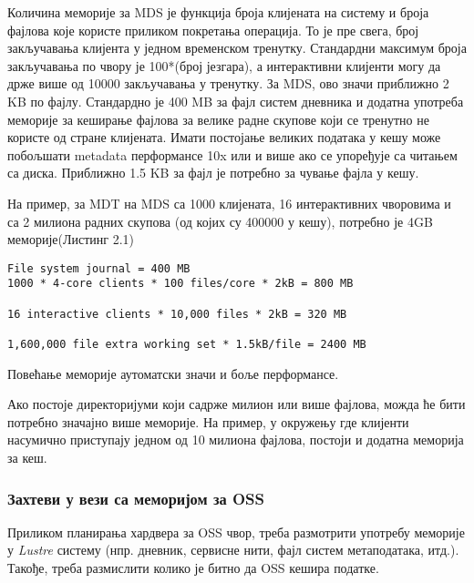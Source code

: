 Количина меморије за MDS је функција броја клијената  на систему и броја фајлова које користе приликом покретања операција. То је пре свега, број закључавања клијента у једном временском тренутку. Стандардни максимум броја закључавања по чвору је 100*(број језгара), а интерактивни клијенти могу да држе више од 10000 закључавања у тренутку. За MDS, ово значи приближно 2 KB по фајлу.
Стандардно је 400 MB за  фајл систем дневника и додатна употреба меморије за кеширање фајлова за велике радне скупове који се тренутно не користе од стране клијената. Имати постојање великих података у кешу  може побољшати metadata перформансе 10x или и више ако се упоређује са читањем са диска. Приближно 1.5 KB за фајл је потребно за чување фајла у кешу. 

На пример, за MDT на MDS са  1000 клијената, 16 интерактивних  чворовима и са 2  милиона радних скупова (од којих су 400000 у кешу), потребно је 4GB меморије(Листинг 2.1)

\begin{lstlisting}[style=nonumbers,frame=single, caption=Количина меморије за MDT]
File system journal = 400 MB
1000 * 4-core clients * 100 files/core * 2kB = 800 MB

16 interactive clients * 10,000 files * 2kB = 320 MB

1,600,000 file extra working set * 1.5kB/file = 2400 MB
\end{lstlisting}

Повећање меморије аутоматски значи и боље перформансе.

Ако постоје директоријуми који садрже милион или више фајлова, можда ће бити потребно значајно  више меморије. На пример, у окружењу где клијенти насумично приступају једном од 10 милиона фајлова, постоји и додатна меморија за кеш.

\subsubsection{Захтеви у вези са меморијом за OSS}

 
Приликом планирања хардвера за OSS чвор, треба размотрити употребу меморије у   \textit{Lustre} систему (нпр. дневник, сервисне нити, фајл систем метаподатака, итд.). Такође, треба размислити колико је битно да OSS  кешира податке.

